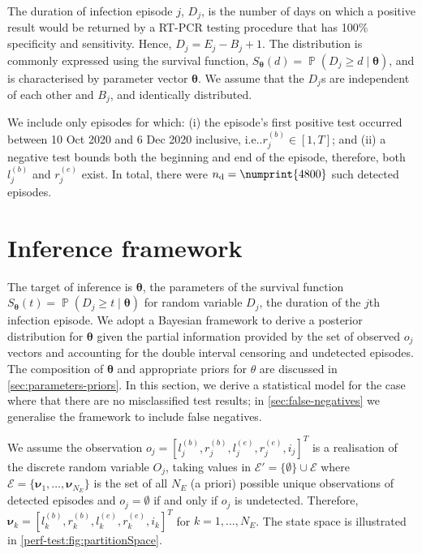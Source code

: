 \documentclass[12pt]{article}
\makeatletter
\DeclareMathOperator{\prob}{\mathbb{P}}
\newcommand\set{\mathcal}
\renewcommand{\vec}[1]{\bm{#1}}
\newcommand{\ntot}{n_\text{tot}}
\newcommand{\ndet}{n_\text{d}}
\DeclareRobustCommand\onedot{\futurelet\@let@token\@onedot}
\def\@onedot{\ifx\@let@token.\else.\null\fi\xspace}
\def\ie{i.e\onedot} \def\Ie{{I.e}\onedot}
\makeatother
\begin{document}
The duration of infection episode $j$, $D_j$, is the number of days on which a positive result would be returned by a RT-PCR testing procedure that has 100\% specificity and sensitivity.
Hence, $D_j = E_j - B_j + 1$.
The distribution is commonly expressed using the survival function, $S_{\vec{\theta}}(d) = \prob(D_j \geq d \mid \vec{\theta})$, and is characterised by parameter vector $\vec{\theta}$.
We assume that the $D_j$s are independent of each other and $B_j$, and identically distributed.

We include only episodes for which: (i) the episode's first positive test occurred between 10 Oct 2020 and 6 Dec 2020 inclusive, \ie $r_j^{(b)} \in [1, T]$; and (ii) a negative test bounds both the beginning and end of the episode,
therefore, both $l_j^{(b)}$ and $r_j^{(e)}$ exist.
In total, there were $\ndet = \numprint{4800}$ such detected episodes.

\section{Inference framework} \label{sec:inference}

The target of inference is $\vec{\theta}$, the parameters of the survival function $S_{\vec{\theta}}(t) = \prob(D_j \geq t \mid \vec\theta)$ for random variable $D_j$, the duration of the $j$th infection episode.
We adopt a Bayesian framework to derive a posterior distribution for $\vec{\theta}$ given the partial information provided by the set of observed $o_j$ vectors and accounting for the double interval censoring and undetected episodes.
The composition of $\vec{\theta}$ and appropriate priors for $\theta$ are discussed in \cref{sec:parameters-priors}.
In this section, we derive a statistical model for the case where that there are no misclassified test results; in \cref{sec:false-negatives} we generalise the framework to include false negatives.

We assume the observation $o_j = [l_j^{(b)}, r_j^{(b)}, l_j^{(e)}, r_j^{(e)}, i_j]^T$ is a realisation of the discrete random variable $O_j$, taking values in $\set{E}' = \{ \emptyset \} \cup \set{E}$ where $\set{E} = \{ \vec{\nu}_1, \dots, \vec{\nu}_{N_E} \}$ is the set of all $N_E$ (a priori) possible unique observations of detected episodes and $o_j = \emptyset$ if and only if $o_j$ is undetected.
Therefore, $\vec{\nu}_k = [l^{(b)}_k, r^{(b)}_k, l^{(e)}_k, r^{(e)}_k, i_k]^T$ for $k = 1, \dots, N_E$.
The state space is illustrated in \cref{perf-test:fig:partitionSpace}.
\end{document}
